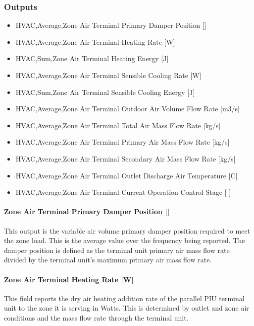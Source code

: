 \subsubsection{Outputs}\label{outputs-8}

\begin{itemize}
\item
  HVAC,Average,Zone Air Terminal Primary Damper Position {[]}
\item
  HVAC,Average,Zone Air Terminal Heating Rate {[}W{]}
\item
  HVAC,Sum,Zone Air Terminal Heating Energy {[}J{]}
\item
  HVAC,Average,Zone Air Terminal Sensible Cooling Rate {[}W{]}
\item
  HVAC,Sum,Zone Air Terminal Sensible Cooling Energy {[}J{]}
\item
  HVAC,Average,Zone Air Terminal Outdoor Air Volume Flow Rate {[}m3/s{]}
\item
  HVAC,Average,Zone Air Terminal Total Air Mass Flow Rate {[}kg/s{]}
\item
  HVAC,Average,Zone Air Terminal Primary Air Mass Flow Rate {[}kg/s{]}
\item
  HVAC,Average,Zone Air Terminal Secondary Air Mass Flow Rate {[}kg/s{]}
\item
  HVAC,Average,Zone Air Terminal Outlet Discharge Air Temperature {[}C{]}
\item
  HVAC,Average,Zone Air Terminal Current Operation Control Stage {[} {]}
\end{itemize}

\paragraph{Zone Air Terminal Primary Damper Position {[]}}\label{zone-air-terminal-parallel-piu-primary-damper-position}

This output is the variable air volume primary damper position required to meet the zone load. This is the average value over the frequency being reported. The damper position is defined as the terminal unit primary air mass flow rate divided by the terminal unit's maximum primary air mass flow rate.

\paragraph{Zone Air Terminal Heating Rate {[}W{]}}\label{zone-air-terminal-heating-rate-w-1}

This field reports the dry air heating addition rate of the parallel PIU terminal unit to the zone it is serving in Watts. This is determined by outlet and zone air conditions and the mass flow rate through the terminal unit.

